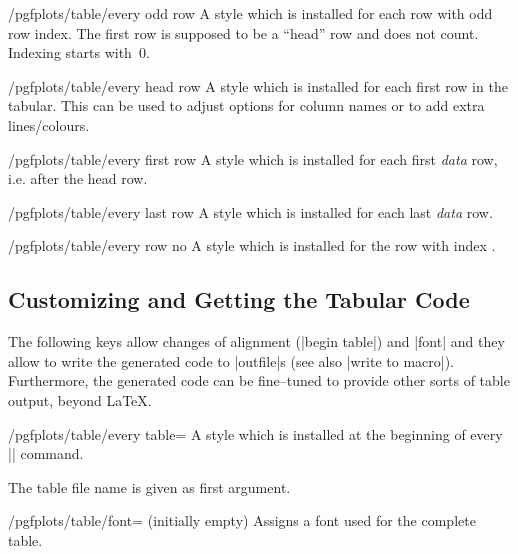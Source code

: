 \begin{stylekey}{/pgfplots/table/every odd row}	
	A style which is installed for each row with odd row index. The first row is supposed to be a ``head'' row and does not count. Indexing starts with~$0$.
\end{stylekey}

\begin{stylekey}{/pgfplots/table/every head row}	
	A style which is installed for each first row in the tabular. This can be used to adjust options for column names or to add extra lines/colours.
\end{stylekey}

\begin{stylekey}{/pgfplots/table/every first row}	
	A style which is installed for each first \emph{data} row, i.e. after the head row.
\end{stylekey}

\begin{stylekey}{/pgfplots/table/every last row}	
	A style which is installed for each last \emph{data} row.
\end{stylekey}

\begin{stylekey}{/pgfplots/table/every row no }	
	A style which is installed for the row with index .
\end{stylekey}

\subsection{Customizing and Getting the Tabular Code}
The following keys allow changes of alignment (|begin table|) and |font| and they allow to write the generated code to |outfile|s (see also |write to macro|). Furthermore, the generated code can be fine--tuned to provide other sorts of table output, beyond \LaTeX.
\begin{stylekey}{/pgfplots/table/every table=}
	A style which is installed at the beginning of every |\pgfplotstabletypeset| command.

	The table file name is given as first argument.
\end{stylekey}

\begin{key}{/pgfplots/table/font= (initially empty)}
	Assigns a font used for the complete table.
\end{key}

